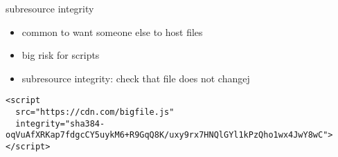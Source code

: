 \begin{frame}[fragile]{subresource integrity}
    \begin{itemize}
    \item common to want someone else to host files
    \item big risk for scripts
    \vspace{.5cm}
    \item subresource integrity: check that file does not changej
    \end{itemize}
\begin{Verbatim}
<script
  src="https://cdn.com/bigfile.js"
  integrity="sha384-oqVuAfXRKap7fdgcCY5uykM6+R9GqQ8K/uxy9rx7HNQlGYl1kPzQho1wx4JwY8wC"></script>
\end{Verbatim}
\end{frame}
